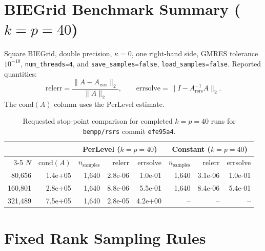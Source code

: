 \documentclass[11pt]{article}
\begin{document}
\section*{BIEGrid Benchmark Summary ($k=p=40$)}

Square BIEGrid, double precision, $\kappa=0$, one right-hand side,
GMRES tolerance $10^{-10}$, \texttt{num\_threads=4}, and
\texttt{save\_samples=false}, \texttt{load\_samples=false}.
Reported quantities:
\[
\text{relerr}=\frac{\|A-A_{\mathrm{rsrs}}\|_2}{\|A\|_2},
\qquad
\text{errsolve}=\|I-A_{\mathrm{rsrs}}^{-1}A\|_2.
\]
The $\mathrm{cond}(A)$ column uses the PerLevel estimate.

\begin{table}[h]
\centering
\small
\begin{tabular}{r r r r r r r r}
\hline
& & \multicolumn{3}{c}{PerLevel ($k=p=40$)} & \multicolumn{3}{c}{Constant ($k=p=40$)} \\
\cline{3-5} \cline{6-8}
$N$ & $\mathrm{cond}(A)$ & $n_{\mathrm{samples}}$ & relerr & errsolve & $n_{\mathrm{samples}}$ & relerr & errsolve \\
\hline
80,656  & 1.4e+05 & 1,640 & 2.8e-06 & 1.0e-01 & 1,640 & 3.1e-06 & 1.0e-01 \\
160,801 & 2.8e+05 & 1,640 & 8.8e-06 & 5.5e-01 & 1,640 & 8.4e-06 & 5.4e-01 \\
321,489 & 7.5e+05 & 1,640 & 2.8e-05 & 4.2e+00 & --    & --      & --      \\
\hline
\end{tabular}
\caption{Requested stop-point comparison for completed $k=p=40$ runs for \texttt{bempp/rsrs} commit \texttt{efe95a4}.}
\label{tab:biegrid_k40_stop_point}
\end{table}

\section*{Fixed Rank Sampling Rules}
\end{document}
